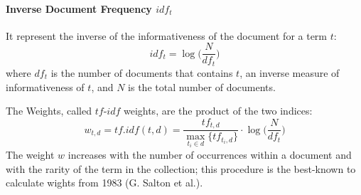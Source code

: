 \documentclass[11pt, a4page]{article}
\begin{document}
\paragraph{Inverse Document Frequency $idf_t$} It represent the inverse of the informativeness of the document for a term $t$:
\begin{equation*}
  idf_t = \log \Big( \frac{N}{df_t} \Big)
\end{equation*}
where $df_t$ is the number of documents that contains $t$, an inverse measure of informativeness of $t$, and $N$ is the total number of documents.
\newline

The Weights, called $tf$-$idf$ weights, are the product of the two indices:
\begin{equation*}
  w_{t, d} = tf.idf(t, d) = \frac{tf_{t, d}}{\displaystyle \max_{t_i \in d} \{ tf_{t_i, d} \}} \cdot \log \Big(\frac{N}{df_t} \Big)
\end{equation*}
The weight $w$ increases with the number of occurrences within a document and with the rarity of the term in the collection; this procedure is the best-known to calculate wights from 1983 (G. Salton et al.).
\end{document}
